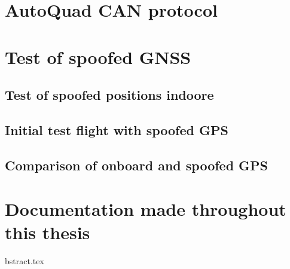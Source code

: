 \section{AutoQuad CAN protocol}

\newpage


\section{Test of spoofed GNSS}


\subsection{Test of spoofed positions indoore}
\label{sec:test_of_spoofed_positions_indoore}



\subsection{Initial test flight with spoofed GPS}
\label{sec:test_of_spoofed_positions_outdoore}


\subsection{Comparison of onboard and spoofed GPS}
\label{sec:test_of_spoofed_positions_outdoore}


\section{Documentation made throughout this thesis}
bstract.tex
